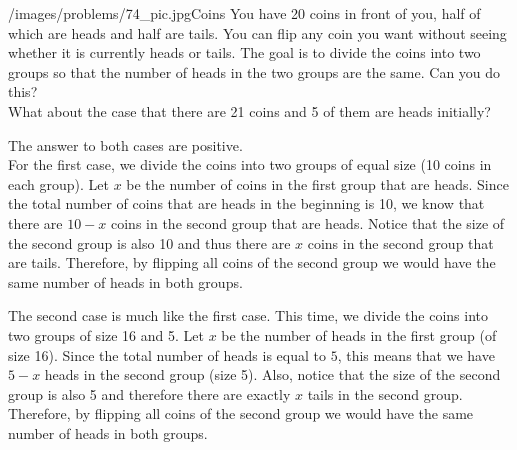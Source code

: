\begin{problem}{/images/problems/74_pic.jpg}{Coins} You have 20 coins in front of you, half of which are heads and half are tails. You can flip any coin you want without seeing whether it is currently heads or tails. The goal is to divide the coins into two groups so that the number of heads in the two groups are the same. Can you do this?\\[0.2cm]
	
What about the case that there are 21 coins and 5 of them are heads initially?
\end{problem}

\begin{solution}
The answer to both cases are positive.\\[0.2cm]

For the first case, we divide the coins into two groups of equal size (10 coins in each group). Let $x$ be the number of coins in the first group that are heads. Since the total number of coins that are heads in the beginning is 10, we know that there are $10-x$ coins in the second group that are heads. Notice that the size of the second group is also 10 and thus there are $x$ coins in the second group that are tails. Therefore, by flipping all coins of the second group we would have the same number of heads in both groups.

The second case is much like the first case. This time, we divide the coins into two groups of size 16 and 5. Let $x$ be the number of heads in the first group (of size 16). Since the total number of heads is equal to $5$, this means that we have $5-x$ heads in the second group (size 5). Also, notice that the size of the second group is also 5 and therefore there are exactly $x$ tails in the second group. Therefore, by flipping all coins of the second group we would have the same number of heads in both groups.
\end{solution}

